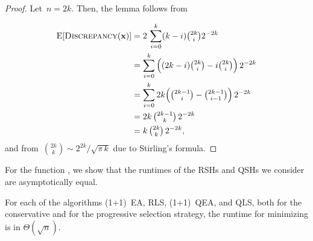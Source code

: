 \documentclass[a4paper,11pt]{article}
\begin{document}
\begin{proof}
Let~$n=2k$. Then, the lemma follows from
\ignore{
\[
\EXP[\discrepancy(\xvec)]=2\,\sum_{i=0}^k(k-i)\tbinom{2k}{i}2^{-2k}=k\,\tbinom{2k}{k}\,2^{-2k}
\]
}
\begin{align*}
\EXP[\discrepancy(\xvec)]
&=2\,\sum_{i=0}^k(k-i)\tbinom{2k}{i}2^{-2k}\\
&=\sum_{i=0}^k\Big((2k-i)\tbinom{2k}{i}-i\tbinom{2k}{i}\Big)\,2^{-2k}\\
&=\sum_{i=0}^k 2k\Big(\tbinom{2k-1}{i}-\tbinom{2k-1}{i-1}\Big)\,2^{-2k}\\
&=2k\,\tbinom{2k-1}{k}\,2^{-2k}\\
&=k\,\tbinom{2k}{k}\,2^{-2k},
\end{align*}
and from~$\binom{2k}{k}\sim 2^{2k}/\sqrt{\pi\,k}$ due to Stirling's formula.
\end{proof}

For the function \discrepancy, we show that the runtimes of the RSHs and QSHs we consider are asymptotically equal.
\begin{theorem}
For each of the algorithms (1+1)~EA, RLS, (1+1)~QEA, and QLS, both for the conservative and for the progressive selection strategy, the runtime for minimizing \discrepancy is in $\Theta(\sqrt{n})$.
\end{theorem}
\end{document}
